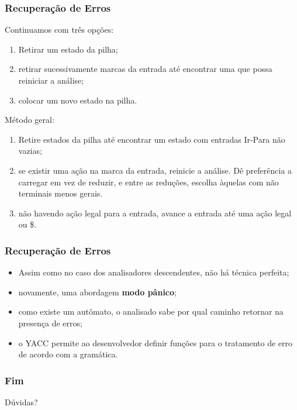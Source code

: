 \documentclass[table]{beamer}
\begin{document}
\begin{frame}
   \frametitle{Recuperação de Erros}
   Continuamos com três opções:
   \begin{enumerate}
      \item Retirar um estado da pilha;
      \item retirar sucessivamente marcas da entrada até encontrar uma que possa reiniciar a análise;
      \item colocar um novo estado na pilha.
   \end{enumerate}
   Método geral:
   \begin{enumerate}
      \item Retire estados da pilha até encontrar um estado com entradas Ir-Para não vazias;
      \item se existir uma ação na marca da entrada, reinicie a análise. Dê preferência a carregar em vez de reduzir, e entre as reduções, escolha àquelas com não terminais menos gerais.
      \item não havendo ação legal para a entrada, avance a entrada até uma ação legal ou \$.
   \end{enumerate}
\end{frame}


\begin{frame}
   \frametitle{Recuperação de Erros}
   \begin{itemize}
      \item Assim como no caso dos analisadores descendentes, não há técnica perfeita;
      \item novamente, uma abordagem \textbf{modo pânico};
      \item como existe um autômato, o analisado sabe por qual caminho retornar na presença de erros;
      \item o YACC permite ao desenvolvedor definir funções para o tratamento de erro de acordo com a gramática.
   \end{itemize}
\end{frame}

\begin{frame}
   \frametitle{Fim}
   Dúvidas?
\end{frame}
\end{document}
